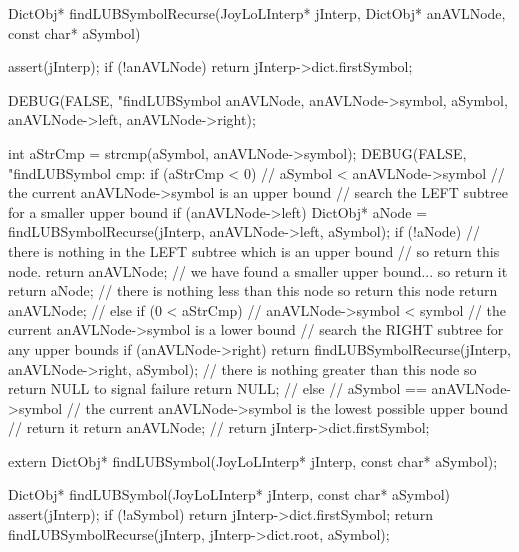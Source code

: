\startCCode
DictObj* findLUBSymbolRecurse(JoyLoLInterp* jInterp,
                              DictObj* anAVLNode,
                              const char* aSymbol) {
  assert(jInterp);
  if (!anAVLNode) return jInterp->dict.firstSymbol;

  DEBUG(FALSE, "findLUBSymbol %
        anAVLNode, anAVLNode->symbol, aSymbol,
        anAVLNode->left, anAVLNode->right);

  int aStrCmp = strcmp(aSymbol, anAVLNode->symbol);
  DEBUG(FALSE, "findLUBSymbol cmp: %
  if (aStrCmp < 0) {
    // aSymbol < anAVLNode->symbol
    // the current anAVLNode->symbol is an upper bound
    // search the LEFT subtree for a smaller upper bound
    if (anAVLNode->left) {
      DictObj* aNode = findLUBSymbolRecurse(jInterp, anAVLNode->left, aSymbol);
      if (!aNode) {
        // there is nothing in the LEFT subtree which is an upper bound
        // so return this node.
        return anAVLNode;
      }
      // we have found a smaller upper bound... so return it
      return aNode;
    }
    // there is nothing less than this node so return this node
    return anAVLNode;
    //
  } else if (0 < aStrCmp) {
    // anAVLNode->symbol < symbol
    // the current anAVLNode->symbol is a lower bound
    // search the RIGHT subtree for any upper bounds
    if (anAVLNode->right) {
      return findLUBSymbolRecurse(jInterp, anAVLNode->right, aSymbol);
    }
    // there is nothing greater than this node so return NULL to signal failure
    return NULL;
    //
  } else {
    // aSymbol == anAVLNode->symbol
    // the current anAVLNode->symbol is the lowest possible upper bound
    // return it
    return anAVLNode;
    //
  }
  return jInterp->dict.firstSymbol;
}
\stopCCode

\startCHeader
extern DictObj* findLUBSymbol(JoyLoLInterp* jInterp, const char* aSymbol);
\stopCHeader

\startCCode
DictObj* findLUBSymbol(JoyLoLInterp* jInterp, const char* aSymbol) {
  assert(jInterp);
  if (!aSymbol) return jInterp->dict.firstSymbol;
  return findLUBSymbolRecurse(jInterp, jInterp->dict.root, aSymbol);
}
\stopCCode
